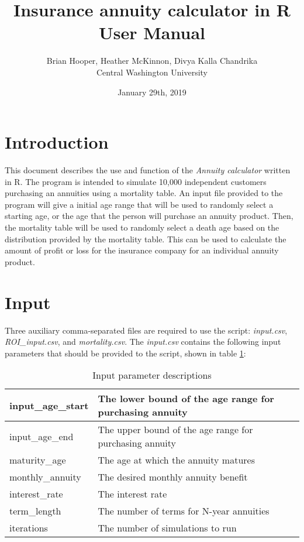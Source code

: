 \documentclass[12pt]{article}
\title{\textbf{Insurance annuity calculator in R} \\ User Manual}
\author{Brian Hooper, Heather McKinnon, Divya Kalla Chandrika  \\ Central Washington University}
\date{January 29th, 2019}
\begin{document}
	\maketitle
	
	\section{Introduction}
	This document describes the use and function of the \textit{Annuity calculator} written in R. The program is intended to simulate 10,000 independent customers purchasing an annuities using a mortality table. An input file provided to the program will give a initial age range that will be used to randomly select a starting age, or the age that the person will purchase an annuity product. Then, the mortality table will be used to randomly select a death age based on the distribution provided by the mortality table. This can be used to calculate the amount of profit or loss for the insurance company for an individual annuity product.
	
	\section{Input}
	Three auxiliary comma-separated files are required to use the script: \textit{input.csv}, \textit{ROI\_input.csv}, and \textit{mortality.csv}. The \textit{input.csv} contains the following input parameters that should be provided to the script, shown in table \ref{description}: 
\begin{table}[H]
	\centering
	\begin{tabular}{|l|l|}
		\hline
		input\_age\_start & The lower bound of the age range for purchasing annuity \\ \hline
		input\_age\_end & The upper bound of the age range for purchasing annuity \\ \hline
		maturity\_age & The age at which the annuity matures \\ \hline
		monthly\_annuity & The desired monthly annuity benefit \\ \hline
		interest\_rate & The interest rate \\ \hline
		term\_length & The number of terms for N-year annuities \\ \hline
		iterations & The number of simulations to run \\ \hline
	\end{tabular}
	\label{description}
	\caption{Input parameter descriptions}
\end{table}
\end{document}
